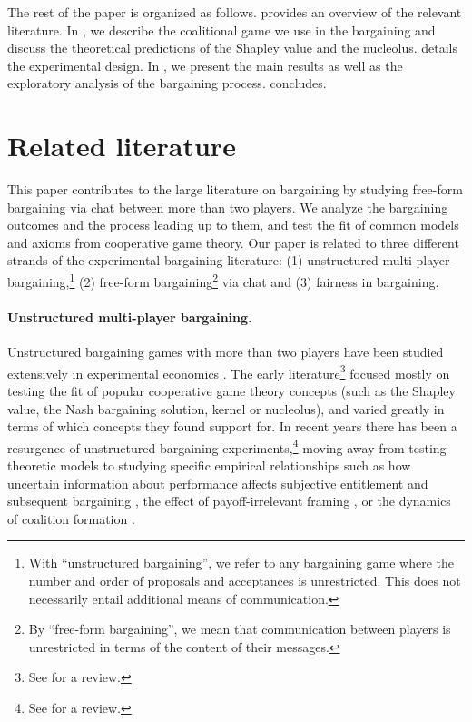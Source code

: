 \documentclass[12pt]{article}
\begin{document}

The rest of the paper is organized as follows.  provides an overview of the relevant literature. In , we describe the coalitional game we use in the bargaining and discuss the theoretical predictions of the Shapley value and the nucleolus.  details the experimental design. In , we present the main results as well as the exploratory analysis of the bargaining process.  concludes.



\section{Related literature} \label{sec:literature}
This paper contributes to the large literature on bargaining by studying free-form bargaining via chat between more than two players. We analyze the bargaining outcomes and the process leading up to them, and test the fit of common models and axioms from cooperative game theory. Our paper is related to three different strands of the experimental bargaining literature: (1) unstructured multi-player-bargaining,\footnote{With ``unstructured bargaining'', we refer to any bargaining game where the number and order of proposals and acceptances is unrestricted. This does not necessarily entail additional means of communication.} (2) free-form bargaining\footnote{By ``free-form bargaining'', we mean that communication between players is unrestricted in terms of the content of their messages.} via chat and (3) fairness in bargaining. 


\paragraph{Unstructured multi-player bargaining.}

Unstructured bargaining games with more than two players have been studied extensively in experimental economics \parencite[e.g.][]{Kalischetal1952, Maschler1965, NydeggerOwen1974, RapoportKahan1976, MurnighanRoth1978, Micheneretal1979, RothMalouf1979, KomoritaHamiltonKravitz1984, LeopoldWildburger1992}. The early literature\footnote{See \cite{Roth1995} for a review.} focused mostly on testing the fit of popular cooperative game theory concepts (such as the Shapley value, the Nash bargaining solution, kernel or nucleolus), and varied greatly in terms of which concepts they found support for. In recent years there has been a resurgence of unstructured bargaining experiments,\footnote{See \cite{karagozouglu2019going} for a review.} moving away from testing theoretic models to studying specific empirical relationships such as how uncertain information about performance affects subjective entitlement and subsequent bargaining \parencite{KaragözoğluRiedl2015}, the effect of payoff-irrelevant framing \parencite{Isonietal2014}, or the dynamics of coalition formation \parencite{TremewanVanberg2016}.
\end{document}
